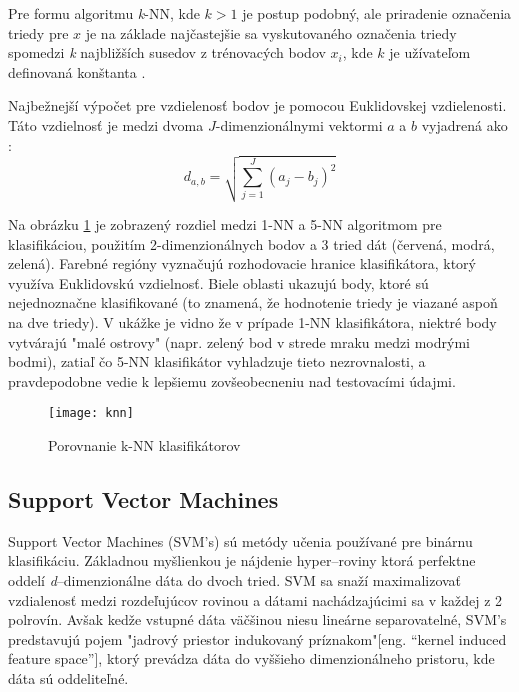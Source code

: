 Pre formu algoritmu \textit{k}-NN, kde $k > 1$ je postup podobný, ale priradenie označenia triedy pre $x$ je na základe najčastejšie sa vyskutovaného označenia triedy
spomedzi \textit{k} najbližších susedov z trénovacých bodov $x_i$, kde $k$ je užívateľom definovaná konštanta \cite{prop:KnnClassification}.

Najbežnejší výpočet pre vzdielenosť bodov je pomocou Euklidovskej vzdielenosti.
Táto vzdielnosť je medzi dvoma $J$-dimenzionálnymi vektormi $a$ a $b$ vyjadrená ako \cite{prop:KnnClassification}:
\begin{equation}
    \label{eq:euclidMetric}
    d_{a,b} = \sqrt{\sum_{j=1}^{J}{(a_j - b_j)^2}}
\end{equation}

Na obrázku \ref{pic:kNN} je zobrazený rozdiel medzi 1-NN a 5-NN algoritmom pre klasifikáciou,
    použitím 2-dimenzionálnych bodov a 3 tried dát (červená, modrá, zelená).
Farebné regióny vyznačujú rozhodovacie hranice klasifikátora, ktorý využíva Euklidovskú vzdielnosť.
Biele oblasti ukazujú body, ktoré sú nejednoznačne klasifikované (to znamená, že hodnotenie triedy je viazané aspoň na dve triedy).
V ukážke je vidno že v prípade 1-NN klasifikátora, niektré body vytvárajú "malé ostrovy"
    (napr. zelený bod v strede mraku medzi modrými bodmi), zatiaľ čo 5-NN klasifikátor vyhladzuje tieto nezrovnalosti,
    a pravdepodobne vedie k lepšiemu zovšeobecneniu nad testovacími údajmi.

\begin{figure}[H]
	\centering
	\texttt{[image: knn]}
	\caption{Porovnanie k-NN klasifikátorov\cite{odkaz:KnnImage}}
	\label{pic:kNN}
\end{figure}


\subsection{Support Vector Machines}
Support Vector Machines (SVM's) sú metódy učenia používané pre binárnu klasifikáciu.
Základnou myšlienkou je nájdenie hyper--roviny ktorá perfektne oddelí \textit{d}--dimenzionálne dáta do dvoch tried\cite{prop:IntroductionToSVM}.
SVM sa snaží maximalizovať vzdialenosť medzi rozdeľujúcov rovinou a dátami nachádzajúcimi sa v každej z 2 polrovín\cite{prop:SupervisedMachineLearning}.
Avšak kedže vstupné dáta väčšinou niesu lineárne separovatelné, SVM's predstavujú pojem "jadrový priestor indukovaný príznakom"[eng. “kernel induced feature space”],
    ktorý prevádza dáta do vyššieho dimenzionálneho pristoru, kde dáta sú oddeliteľné.\cite{prop:IntroductionToSVM}

